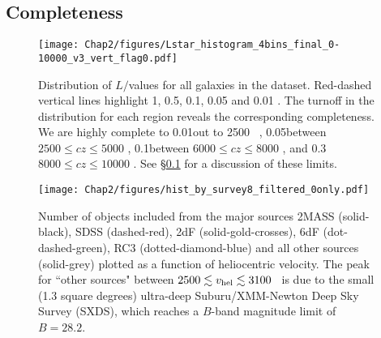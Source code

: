 \subsection{Completeness} \label{completeness}

\begin{figure}[ht!]
        \centering
        \vspace{0pt}
        \texttt{[image: Chap2/figures/Lstar\_histogram\_4bins\_final\_0-10000\_v3\_vert\_flag0.pdf]}
        \caption{\small{Distribution of $L/$\Lstar values  for all galaxies in the dataset. Red-dashed vertical lines highlight 1, 0.5, 0.1, 0.05 and 0.01 \Lstar. The turnoff in the distribution for each region reveals the corresponding completeness. We are highly complete to 0.01\Lstar out to 2500 \kms~, 0.05\Lstar between $2500 \leq cz \leq 5000$ \kms, 0.1\Lstar between $6000 \leq cz \leq 8000$ \kms, and 0.3\Lstar $8000 \leq cz \leq 10000$ \kms. See \S \ref{completeness} for a discussion of these limits.}}
        \vspace{5pt}
        \label{completeness_plot}
\end{figure} 

\begin{figure}[ht!]
        \centering
        \vspace{0pt}
        \texttt{[image: Chap2/figures/hist\_by\_survey8\_filtered\_0only.pdf]}
        \caption{\small{Number of objects included from the major sources 2MASS (solid-black), SDSS (dashed-red), 2dF (solid-gold-crosses), 6dF (dot-dashed-green), RC3 (dotted-diamond-blue) and all other sources (solid-grey) plotted as a function of heliocentric velocity. The peak for ``other sources" between $2500 \lesssim v_{\rm hel} \lesssim 3100$ \kms~is due to the small (1.3 square degrees) ultra-deep Suburu/XMM-Newton Deep Sky Survey (SXDS), which reaches a $B$-band magnitude limit of $B=28.2$.}}
        \vspace{5pt}
        \label{source_histograms}
\end{figure} 




